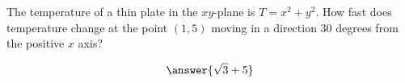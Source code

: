 \documentclass{ximera}
\author{David Guichard \and Neal Koblitz \and H. Jerome Keisler \and Albert Scheller \and Barry Balof \and Mike Wills \and Matthew Carr}
\begin{document}
\begin{exercise}




The temperature of a thin plate in the $xy$-plane is $T=x^2+y^2$. How fast does temperature change at the point $(1,5)$ moving in a direction $30$ degrees from the positive $x$ axis?

\begin{prompt}
\[
\answer{\sqrt{3}+5}
\]
\end{prompt}

\end{exercise}
\end{document}
